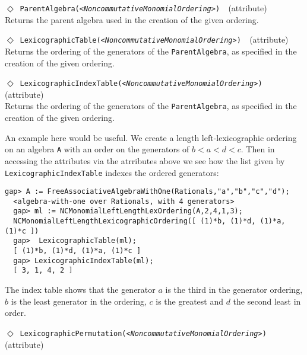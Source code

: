 \documentclass[a4paper,11pt]{report}
\begin{document}
{{{ \noindent\textcolor{FuncColor}{$\Diamond$\ \texttt{ParentAlgebra({\slshape {\textless}NoncommutativeMonomialOrdering{\textgreater}})
\label{ParentAlgebra}
}\hfill{\scriptsize (attribute)}}\\


 Returns the parent algebra used in the creation of the given ordering. 

 \noindent\textcolor{FuncColor}{$\Diamond$\ \texttt{LexicographicTable({\slshape {\textless}NoncommutativeMonomialOrdering{\textgreater}})
\label{LexicographicTable}
}\hfill{\scriptsize (attribute)}}\\


 Returns the ordering of the generators of the \texttt{ParentAlgebra}, as specified in the creation of the given ordering. 

 \noindent\textcolor{FuncColor}{$\Diamond$\ \texttt{LexicographicIndexTable({\slshape {\textless}NoncommutativeMonomialOrdering{\textgreater}})
\label{LexicographicIndexTable}
}\hfill{\scriptsize (attribute)}}\\


 Returns the ordering of the generators of the \texttt{ParentAlgebra}, as specified in the creation of the given ordering. 

 An example here would be useful. We create a length left-lexicographic
ordering on an algebra \texttt{A} with an order on the generators of $b < a < d < c$. Then in accessing the attributes via the atrributes above we see how the
list given by \texttt{LexicographicIndexTable} indexes the ordered generators: 
\begin{Verbatim}[fontsize=\small,frame=single,label=Example]
  gap> A := FreeAssociativeAlgebraWithOne(Rationals,"a","b","c","d");
  <algebra-with-one over Rationals, with 4 generators>
  gap> ml := NCMonomialLeftLengthLexOrdering(A,2,4,1,3);
  NCMonomialLeftLengthLexicographicOrdering([ (1)*b, (1)*d, (1)*a, (1)*c ])
  gap>  LexicographicTable(ml);
  [ (1)*b, (1)*d, (1)*a, (1)*c ]
  gap> LexicographicIndexTable(ml);
  [ 3, 1, 4, 2 ]
\end{Verbatim}
 The index table shows that the generator $a$ is the third in the generator ordering, $b$ is the least generator in the ordering, $c$ is the greatest and $d$ the second least in order. 

 \noindent\textcolor{FuncColor}{$\Diamond$\ \texttt{LexicographicPermutation({\slshape {\textless}NoncommutativeMonomialOrdering{\textgreater}})
\label{LexicographicPermutation}
}\hfill{\scriptsize (attribute)}}\\


}}}
\end{document}
